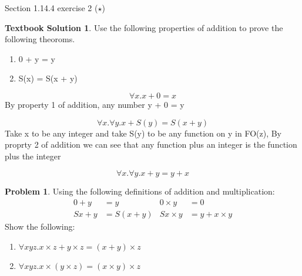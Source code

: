 \documentclass[10pt]{article}
\theoremstyle{definition}
\newtheorem{prob}{Problem}
\newtheorem{ts}{Textbook Solution}
\begin{document}
Section 1.14.4 exercise 2 ($\star$)
\begin{ts}
Use the following properties of addition to prove the following theoroms.
	\begin{enumerate}
	\item 0 + y = y  
	\item S(x)  = S(x + y) 
	\end{enumerate}
	
	\begin{equation}
	\forall x. x + 0 = x
	\end{equation}
	By property 1 of addition, any number y + 0 = y
	
	\begin{equation}
	\forall x. \forall y. x + S(y) = S(x+y)
	\end{equation}
	Take x to be any integer and take S(y) to be any function on y in FO(z), By proprty 2 of addition we can see that any function plus an integer is the function plus the integer
	
	\begin{equation}
	\forall x. \forall y. x + y = y + x
	\end{equation}
\end{ts}



\begin{prob}
  Using the following definitions of addition and multiplication:
  \begin{align*}
    0 + y &= y & 0 \times y &= 0 \\
    Sx + y &= S(x + y) & Sx \times y &= y + x \times y
  \end{align*}
  Show the following:
  \begin{enumerate}[label=(\alph*)]
  \item $\forall x y z. x \times z + y \times z = (x + y) \times z$
  \item $\forall x y z. x \times (y \times z) = (x \times y) \times z$
  \end{enumerate}

\end{prob}
\end{document}
